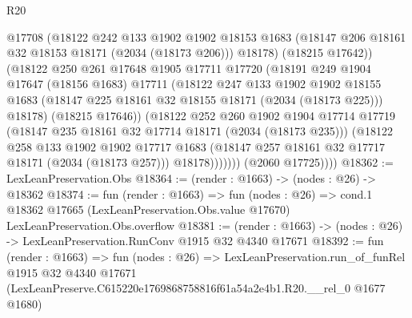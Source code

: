 \begin{lexlean}{R20}
\begin{coremodule}
                    @17708
                    (@18122
                      @242
                      @133
                      @1902
                      @1902
                      @18153
                      @1683
                      (@18147 @206 @18161 @32 @18153 @18171 (@2034 (@18173 @206)))
                      @18178)
                    (@18215 @17642))
                  (@18122
                    @250
                    @261
                    @17648
                    @1905
                    @17711
                    @17720
                    (@18191
                      @249
                      @1904
                      @17647
                      (@18156 @1683)
                      @17711
                      (@18122
                        @247
                        @133
                        @1902
                        @1902
                        @18155
                        @1683
                        (@18147 @225 @18161 @32 @18155 @18171 (@2034 (@18173 @225)))
                        @18178)
                      (@18215 @17646))
                    (@18122
                      @252
                      @260
                      @1902
                      @1904
                      @17714
                      @17719
                      (@18147 @235 @18161 @32 @17714 @18171 (@2034 (@18173 @235)))
                      (@18122
                        @258
                        @133
                        @1902
                        @1902
                        @17717
                        @1683
                        (@18147 @257 @18161 @32 @17717 @18171 (@2034 (@18173 @257)))
                        @18178)))))))
          (@2060 @17725))))
@18362 := LexLeanPreservation.Obs
@18364 := (render : @1663) -> (nodes : @26) -> @18362
@18374 := fun (render : @1663) =>
  fun (nodes : @26) =>
  cond.{1} @18362 @17665 (LexLeanPreservation.Obs.value @17670) LexLeanPreservation.Obs.overflow
@18381 := (render : @1663) -> (nodes : @26) -> LexLeanPreservation.RunConv @1915 @32 @4340 @17671
@18392 := fun (render : @1663) =>
  fun (nodes : @26) =>
  LexLeanPreservation.run_of_funRel
    @1915
    @32
    @4340
    @17671
    (LexLeanPreserve.C615220e1769868758816f61a54a2e4b1.R20.__rel_0 @1677 @1680)
\end{coremodule}
\end{lexlean}

